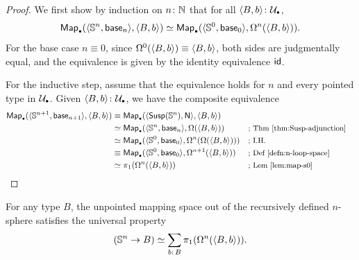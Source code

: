 \begin{proof}
    We first show by induction on $n\colon\N$ that for all $\dep{B,b}\colon\puniv$,
    \[
        \fun{Map}_\sbull
            (
                \dep{\sphere^n,\fun{base}_n},
                \dep{B,b}
            )
        \simeq \fun{Map}_\sbull
            (
                \dep{\sphere^0,\fun{base}_0},
                \Omega^n(\dep{B,b})
            ).
    \]
    For the base case $n\equiv 0$, since $\Omega^0(\langle B,b\rangle) \equiv \langle B,b\rangle$, both sides are judgmentally equal, and the equivalence is given by the identity equivalence $\mathsf{id}$.
    
    For the inductive step, assume that the equivalence holds for $n$ and every pointed type in $\puniv$. Given $\dep{B,b}\colon\puniv$, we have the composite equivalence
    \begin{align*}
        \fun{Map}_\sbull
            (
                \dep{\sphere^{n+1},\fun{base}_{n+1}},
                \dep{B,b}
            )
            &\equiv
                \fun{Map}_\sbull
                    (
                        \dep{
                            \fun{Susp}(\sphere^n),
                            \fun N
                        },
                        \dep{B,b}
                    )\\
            &\simeq
                \fun{Map}_\sbull
                    (
                        \dep
                            {
                                \sphere^n,
                                \fun{base}_n
                            },
                            \Omega(\dep{B,b})
                    )
                &&\text{\small; Thm~\ref{thm:Susp-adjunction}}\\
            &\simeq
            \fun{Map}_\sbull
                (
                    \dep{\sphere^0,\fun{base}_0},
                    \Omega^n(\Omega(\dep{B,b}))
                )
                &&\text{\small; I.H.}\\
            &\equiv
            \fun{Map}_\sbull
                (
                    \dep{\sphere^0,\fun{base}_0},
                    \Omega^{n+1}(\dep{B,b})
                )
                &&\text{\small; Def~\ref{defn:n-loop-space}}\\
             &\simeq
                \pi_1(\Omega^n(\dep{B,b}))
                &&\text{\small; Lem~\ref{lem:map-s0}}
    \end{align*}
\end{proof}

\begin{cor}\label{cor:unpointed-univ-prop-sn}
    For any type\/ $B$, the unpointed mapping space out of the recursively defined\/ $n$-sphere satisfies the universal property
    \[
        (\sphere^n\to B)
        \simeq
        \sum_{b\colon B}\pi_1(\Omega^n(\dep{B,b})).
    \]
\end{cor}


